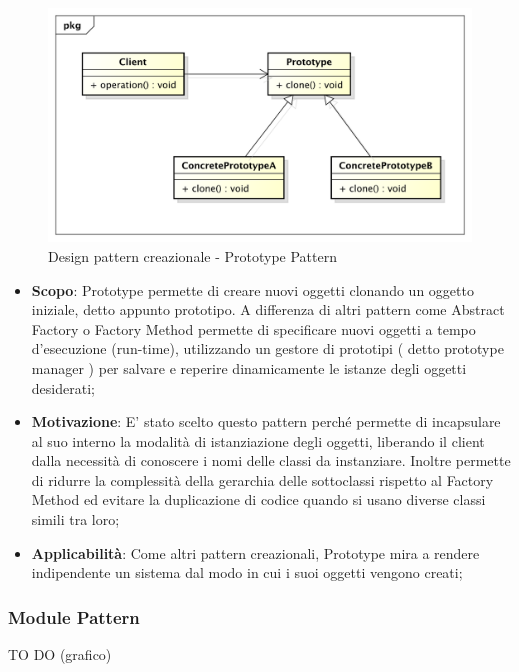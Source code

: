 		\begin{figure}[htbp]
			\centering
			\centerline{\includegraphics[scale=0.5]{./images/designpatternappendice/prototype.pdf}}
			\caption{Design pattern creazionale - Prototype Pattern}
		\end{figure}

		\begin{itemize}
			\item \textbf{Scopo}: Prototype permette di creare nuovi oggetti clonando un oggetto iniziale, detto appunto prototipo. A differenza di altri pattern come Abstract Factory o Factory Method permette di specificare nuovi oggetti a tempo d'esecuzione (run-time), utilizzando un gestore di prototipi ( detto prototype manager ) per salvare e reperire dinamicamente le istanze degli oggetti desiderati;

			\item \textbf{Motivazione}: E' stato scelto questo pattern perché permette di incapsulare al suo interno la modalità di istanziazione degli oggetti, liberando il client dalla necessità di conoscere i nomi delle classi da instanziare. Inoltre permette di ridurre la complessità della gerarchia delle sottoclassi rispetto al Factory Method ed evitare la duplicazione di codice quando si usano diverse classi simili tra loro;

			\item \textbf{Applicabilità}: Come altri pattern creazionali, Prototype mira a rendere indipendente un sistema dal modo in cui i suoi oggetti vengono creati;

		\end{itemize}

		\newpage
		\subsubsection{Module Pattern} %
		TO DO (grafico)

